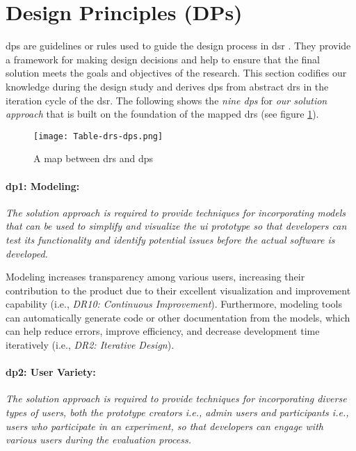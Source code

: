 \section{Design Principles (DPs)}
\label{design:section:designprinciple}
\ac{dp}s are guidelines or rules used to guide the design process in \ac{dsr} \cite{misc:dsr:henver}. 
They provide a framework for making design decisions \cite{paper:designprinciple:gregor} and help to ensure that the final solution meets the goals and objectives of the research. 
This section codifies our knowledge during the design study and derives \ac{dp}s from abstract \ac{dr}s in the iteration cycle of the \ac{dsr}.
The following shows the \textit{nine \ac{dp}s} for \textit{our solution approach} that is built on the foundation of the mapped \ac{dr}s (see figure \ref{fig:design:table-drs-dps}). 
\begin{figure}[htbp!]
  \centering    
  \texttt{[image: Table-drs-dps.png]}
  \caption[A map between \ac{dr}s and \ac{dp}s]{A map between \ac{dr}s and \ac{dp}s}
  \label{fig:design:table-drs-dps}
\end{figure}
\clearpage

\paragraph{\ac{dp}1: Modeling:} \textit{The solution approach is required to provide techniques for incorporating models that can be used to simplify and visualize the \ac{ui} prototype so that developers can test its functionality and identify potential issues before the actual software is developed.}

Modeling increases transparency among various users, increasing their contribution to the product due to their excellent visualization and improvement capability (i.e., \textit{DR10: Continuous Improvement}).
Furthermore, modeling tools can automatically generate code or other documentation from the models, which can help reduce errors, improve efficiency, and decrease development time iteratively (i.e., \textit{DR2: Iterative Design}).

\paragraph{\ac{dp}2: User Variety:} \textit{The solution approach is required to provide techniques for incorporating diverse types of users, both the prototype creators i.e., admin users and participants i.e., users who participate in an experiment, so that developers can engage with various users during the evaluation process.}

